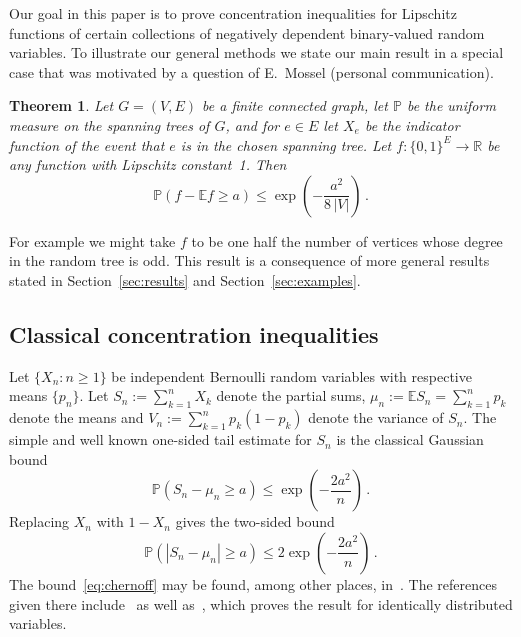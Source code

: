 \documentclass[10pt]{article}
\theoremstyle{plain}
\newtheorem{thm}{Theorem}[section]
\theoremstyle{remark}
\def\R{\mathbb{R}}
\def\E{{\mathbb E}}
\def\P{{\mathbb P}}
\def\mean{\mu}
\begin{document}
Our goal in this paper is to prove concentration inequalities
for Lipschitz functions of certain collections of negatively
dependent binary-valued random variables.  To illustrate our
general methods we state our main result in a special case
that was motivated by a question of E.\ Mossel (personal communication).
%
\begin{thm} \label{th:sp tree}
Let $G = (V,E)$ be a finite connected graph, let $\P$ be the
uniform measure on the spanning trees of $G$, and for $e \in E$
let $X_e$ be the indicator function of the event that $e$ is
in the chosen spanning tree.  Let $f : \{ 0 , 1 \}^E \to \R$
be any function with Lipschitz constant~1.  Then
$$\P (f - \E f \geq a) \leq \exp \left ( - \frac{a^2}{8 \, |V|}
   \right ) \, .$$
\end{thm}
For example we might take $f$ to be one half the number of
vertices whose degree in the random tree is odd.  This result
is a consequence of more general results stated in
Section~\ref{sec:results} and Section~\ref{sec:examples}.

\subsection{Classical concentration inequalities}

Let $\{ X_n : n \geq 1 \}$ be independent Bernoulli random variables
with respective means $\{ p_n \}$.  Let $S_n := \sum_{k=1}^n X_k$
denote the partial sums, $\mean_n := \E S_n = \sum_{k=1}^n p_k$ denote
the means and $V_n := \sum_{k=1}^n p_k (1-p_k)$ denote the variance
of $S_n$.  The simple and well known one-sided tail estimate for
$S_n$ is the classical Gaussian bound
\begin{equation} \label{eq:chernoff}
\P (S_n - \mean_n \geq a) \leq
   \exp \left  (- \frac{2 a^2}{n} \right ) \, .
\end{equation}
Replacing $X_n$ with $1-X_n$ gives the two-sided bound
\begin{equation} \label{eq:two-sided}
\P (|S_n - \mean_n| \geq a) \leq 2
   \exp \left  (- \frac{2 a^2}{n} \right ) \, .
\end{equation}
The bound~\eqref{eq:chernoff} may be found, among other places,
in~\cite[Corollary~5.2]{mcdiarmid89}.
The references given there include~\cite[(2.3)]{hoeffding}
as well as~\cite{chernoff}, which proves the result for
identically distributed variables.
\end{document}
